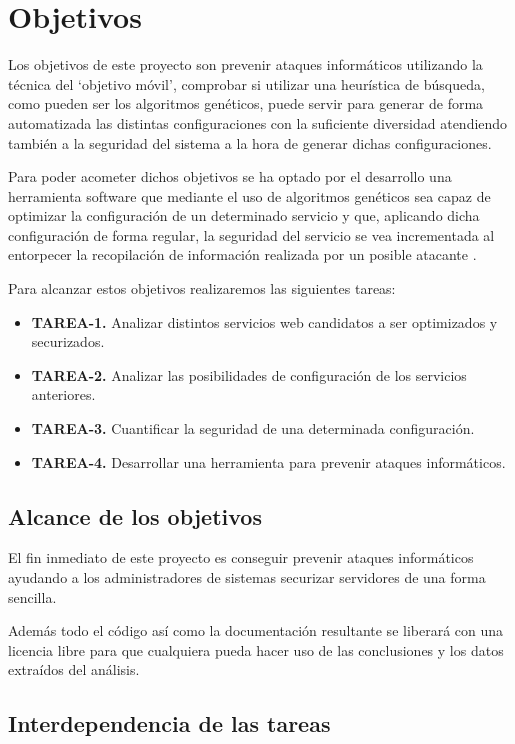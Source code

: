 \chapter{Objetivos}

Los objetivos de este proyecto son prevenir ataques informáticos utilizando la técnica del `objetivo móvil', comprobar si utilizar una heurística de búsqueda, como pueden ser los algoritmos genéticos, puede servir para generar de forma automatizada las distintas configuraciones con la suficiente diversidad atendiendo también a la seguridad del sistema a la hora de generar dichas configuraciones.

\bigskip
Para poder acometer dichos objetivos se ha optado por el desarrollo una herramienta software que mediante el uso de algoritmos genéticos sea capaz de optimizar la configuración de un determinado servicio y que, aplicando dicha configuración de forma regular, la seguridad del servicio se vea incrementada al entorpecer la recopilación de información realizada por un posible atacante \cite{john_evolutionary_2014}.

\bigskip
Para alcanzar estos objetivos realizaremos las siguientes tareas:

\begin{itemize}
  \item \textbf{TAREA-1.} Analizar distintos servicios web candidatos a ser optimizados y securizados.
  \item \textbf{TAREA-2.} Analizar las posibilidades de configuración de los servicios anteriores.
  \item \textbf{TAREA-3.} Cuantificar la seguridad de una determinada configuración.
  \item \textbf{TAREA-4.} Desarrollar una herramienta para prevenir ataques informáticos.
\end{itemize}

\section{Alcance de los objetivos}
El fin inmediato de este proyecto es conseguir prevenir ataques informáticos ayudando a los administradores de sistemas securizar servidores de una forma sencilla.

\bigskip
Además todo el código así como la documentación resultante se liberará con una licencia libre para que cualquiera pueda hacer uso de las conclusiones y los datos extraídos del análisis.

\section{Interdependencia de las tareas}

